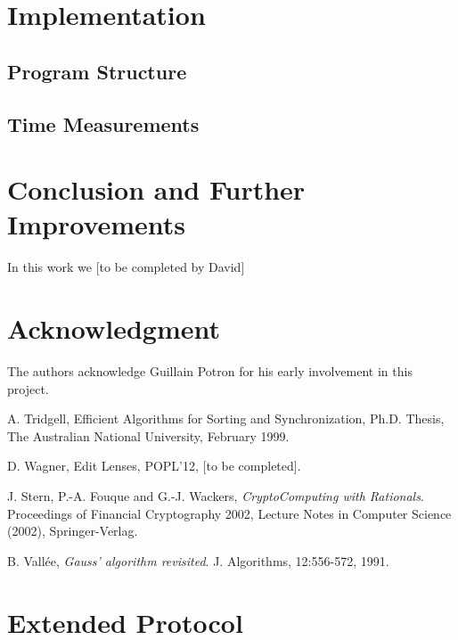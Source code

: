 \documentclass[11pt]{llncs}
\begin{document}
\section{Implementation}

\subsection{Program Structure}

\subsection{Time Measurements}

\section{Conclusion and Further Improvements}

In this work we [to be completed by David]

\section{Acknowledgment}

The authors acknowledge Guillain Potron for his early involvement in this project.

\begin{thebibliography}{30}

 A. Tridgell, Efficient Algorithms for Sorting and Synchronization, Ph.D. Thesis, The Australian National University, February 1999.

 D. Wagner, Edit Lenses, POPL'12, [to be completed].

 J. Stern, P.-A. Fouque and G.-J. Wackers, {\sl CryptoComputing with Rationals}. Proceedings of Financial Cryptography 2002, Lecture Notes in Computer Science (2002), Springer-Verlag. \smallskip

 B. Vall\'ee, {\sl Gauss' algorithm revisited}. J. Algorithms, 12:556-572, 1991.

\end{thebibliography}

\appendix

\section{Extended Protocol}
\end{document}
